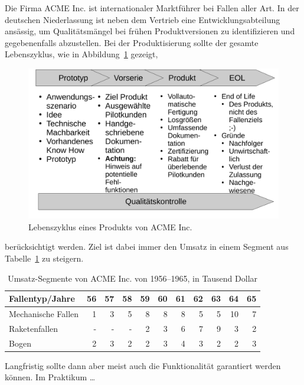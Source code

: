 \documentclass[11pt,a4paper]{report}
\begin{document}
    Die Firma
    ACME Inc.\cite{acme,acmecatalog,kenner1994chuck} ist internationaler Marktführer
    bei Fallen aller Art.
    In der deutschen Niederlassung ist neben dem Vertrieb eine
    Entwicklungsabteilung ansässig, um Qualitätsmängel bei frühen
    Produktversionen zu identifizieren und gegebenenfalls abzustellen.
    Bei der Produktisierung sollte der gesamte Lebenszyklus,
    wie in Abbildung~\ref{fig:lifecycle} gezeigt,
    \begin{figure}[htp]
        \centering
        \includegraphics[width=.9\textwidth]{res/ablauf}
        \caption{Lebenszyklus eines Produkts von ACME Inc.}
        \label{fig:lifecycle}
    \end{figure}
    berücksichtigt werden.
    Ziel ist dabei immer den Umsatz in einem Segment aus Tabelle~\ref{tab:umsatz}
    zu steigern.
    \begin{table}[htp]
        \centering
        \begin{tabular}{l|rrrrrrrrrr}
            Fallentyp/Jahre    & 56 & 57 & 58 & 59 & 60 & 61 & 62 & 63 & 64 & 65 \\\hline\hline
            Mechanische Fallen & 1  & 3  & 5  & 8  & 8  &  8 &  5 &  5 & 10 & 7 \\
            Raketenfallen      & -  & -  & -  & 2  & 3  &  6 &  7 &  9 &  3 & 2 \\
            Bogen              & 2  & 3  & 2  & 2  & 3  &  4 &  3 &  2 &  2 & 3 \\
        \end{tabular}
        \caption{Umsatz-Segmente von ACME Inc. von 1956--1965, in Tausend Dollar}
        \label{tab:umsatz}
    \end{table}
    Langfristig sollte dann aber meist auch die Funktionalität garantiert
    werden können.
    Im Praktikum \ldots
\end{document}
